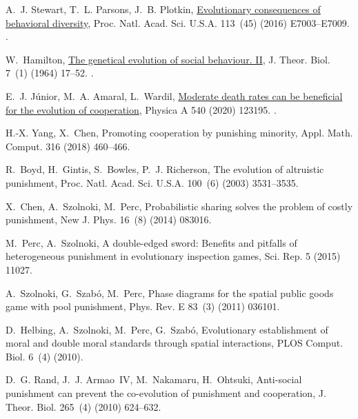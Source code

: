 \documentclass[5p]{elsarticle}
\begin{document}
\begin{thebibliography}{10}
A.~J. Stewart, T.~L. Parsons, J.~B. Plotkin,
  \href{http://www.pnas.org/lookup/doi/10.1073/pnas.1608990113}{{Evolutionary
  consequences of behavioral diversity}}, Proc. Natl. Acad. Sci. U.S.A. 113~(45)
  (2016) E7003--E7009.
  \href {https://doi.org/10.1073/pnas.1608990113}
  {}.

W.~Hamilton,
  \href{http://linkinghub.elsevier.com/retrieve/pii/0022519364900396}{{The
  genetical evolution of social behaviour. II}}, J. Theor. Biol. 7~(1) (1964)
  17--52.
\newblock \href {https://doi.org/10.1016/0022-5193(64)90039-6}
  {}.

E.~J. J{\'{u}}nior, M.~A. Amaral, L.~Wardil,
  \href{https://linkinghub.elsevier.com/retrieve/pii/S0378437119317960}{{Moderate
  death rates can be beneficial for the evolution of cooperation}}, Physica A
  540 (2020) 123195.
\newblock \href {https://doi.org/10.1016/j.physa.2019.123195}
  {}.

H.-X. Yang, X.~Chen, Promoting cooperation by punishing minority, Appl. Math. Comput.  316 (2018) 460--466.

R.~Boyd, H.~Gintis, S.~Bowles, P.~J. Richerson, The evolution of altruistic
  punishment, Proc. Natl. Acad. Sci. U.S.A. 100~(6) (2003) 3531--3535.

X.~Chen, A.~Szolnoki, M.~Perc, Probabilistic sharing solves the problem of
  costly punishment, New J. Phys. 16~(8) (2014) 083016.

M.~Perc, A.~Szolnoki, A double-edged sword: Benefits and pitfalls of heterogeneous punishment in evolutionary inspection games, Sci. Rep. 5 (2015) 11027.

A.~Szolnoki, G.~Szab{\'o}, M.~Perc, Phase diagrams for the spatial public goods  game with pool punishment, Phys. Rev. E 83~(3) (2011) 036101.

D.~Helbing, A.~Szolnoki, M.~Perc, G.~Szab{\'o}, Evolutionary establishment of
  moral and double moral standards through spatial interactions, PLOS Comput. Biol. 6~(4) (2010).

D.~G. Rand, J.~J. Armao~IV, M.~Nakamaru, H.~Ohtsuki, Anti-social punishment can
  prevent the co-evolution of punishment and cooperation, J. Theor. Biol. 265~(4) (2010) 624--632.


\end{thebibliography}
\end{document}
